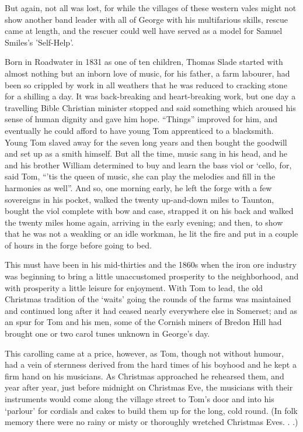 
But again, not all was lost, for while the villages of these western vales might not show another band leader with all of George with his multifarious skills, rescue came at length, and the rescuer could well have served as a model for Samuel Smiles’s 'Self-Help'. 

Born in Roadwater in 1831 as one of ten children, Thomas Slade started with almost nothing but an inborn love of music, for his father, a farm labourer, had been so crippled by work in all weathers that he was reduced to cracking stone for a shilling a day. It was back-breaking and heart-breaking work, but one day a travelling Bible Christian minister stopped and said something which aroused his sense of human dignity and gave him hope. “Things” improved for him, and eventually he could afford to have young Tom apprenticed to a blacksmith. Young Tom slaved away for the seven long years and then bought the goodwill and set up as a smith himself. But all the time, music sang in his head, and he and his brother William determined to buy and learn the bass viol or ‘cello, for, said Tom, “’tis the queen of music, she can play the melodies and fill in the harmonies as well”. And so, one morning early, he left the forge with a few sovereigns in his pocket, walked the twenty up-and-down miles to Taunton, bought the viol complete with bow and case, strapped it on his back and walked the twenty miles home again, arriving in the early evening; and then, to show that he was not a weakling or an idle workman, he lit the fire and put in a couple of hours in the forge before going to bed. 

This must have been in his mid-thirties and the 1860s when the iron ore industry was beginning to bring a little unaccustomed prosperity to the neighborhood, and with prosperity a little leisure for enjoyment. With Tom to lead, the old Christmas tradition of the ‘waits’ going the rounds of the farms was maintained and continued long after it had ceased nearly everywhere else in Somerset; and as an spur for Tom and his men, some of the Cornish miners of Bredon Hill had brought one or two carol tunes unknown in George’s day. 

This carolling came at a price, however, as Tom, though not without humour, had a vein of sternness derived from the hard times of his boyhood and he kept a firm hand on his musicians. As Christmas approached he rehearsed them, and year after year, just before midnight on Christmas Eve, the musicians with their instruments would come along the village street to Tom’s door and into his ‘parlour’ for cordials and cakes to build them up for the long, cold round. (In folk memory there were no rainy or misty or thoroughly wretched Christmas Eves. . .) 

